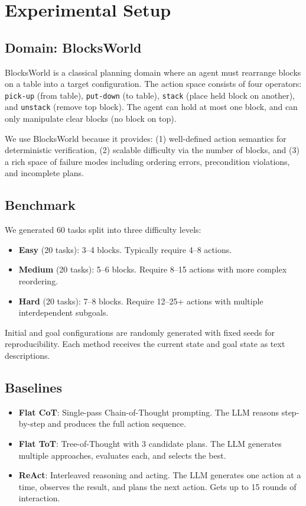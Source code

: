 \documentclass{article}
\begin{document}
\section{Experimental Setup}

\subsection{Domain: BlocksWorld}

BlocksWorld is a classical planning domain where an agent must rearrange blocks on a table into a target configuration. The action space consists of four operators: \texttt{pick-up} (from table), \texttt{put-down} (to table), \texttt{stack} (place held block on another), and \texttt{unstack} (remove top block). The agent can hold at most one block, and can only manipulate clear blocks (no block on top).

We use BlocksWorld because it provides: (1) well-defined action semantics for deterministic verification, (2) scalable difficulty via the number of blocks, and (3) a rich space of failure modes including ordering errors, precondition violations, and incomplete plans.

\subsection{Benchmark}

We generated 60 tasks split into three difficulty levels:
\begin{itemize}[leftmargin=*]
    \item \textbf{Easy} (20 tasks): 3--4 blocks. Typically require 4--8 actions.
    \item \textbf{Medium} (20 tasks): 5--6 blocks. Require 8--15 actions with more complex reordering.
    \item \textbf{Hard} (20 tasks): 7--8 blocks. Require 12--25+ actions with multiple interdependent subgoals.
\end{itemize}

Initial and goal configurations are randomly generated with fixed seeds for reproducibility. Each method receives the current state and goal state as text descriptions.

\subsection{Baselines}

\begin{itemize}[leftmargin=*]
    \item \textbf{Flat CoT}: Single-pass Chain-of-Thought prompting. The LLM reasons step-by-step and produces the full action sequence.
    \item \textbf{Flat ToT}: Tree-of-Thought with 3 candidate plans. The LLM generates multiple approaches, evaluates each, and selects the best.
    \item \textbf{ReAct}: Interleaved reasoning and acting. The LLM generates one action at a time, observes the result, and plans the next action. Gets up to 15 rounds of interaction.
\end{itemize}
\end{document}
